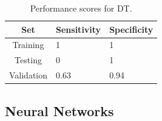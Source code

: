 \documentclass[conference]{IEEEtran}
\theoremstyle{definition}
\theoremstyle{remark}
\theoremstyle{remark}
\begin{document}
\begin{table}
\centering
\caption{Performance scores for DT.}
\label{tab:DT_emb}
\begin{tabular}{cll}
\hline
\textbf{Set} & \multicolumn{1}{c}{\textbf{Sensitivity}} & \multicolumn{1}{c}{\textbf{Specificity}} \\ \hline
Training & 1 & 1 \\
Testing & 0 & 1 \\
Validation & 0.63 & 0.94 \\ \hline
\end{tabular}
\end{table}

\subsection{Neural Networks}
\end{document}
